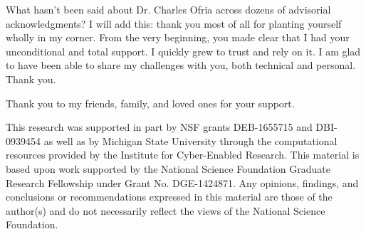 What hasn't been said about Dr. Charles Ofria across dozens of advisorial acknowledgments?
I will add this: thank you most of all for planting yourself wholly in my corner.
From the very beginning, you made clear that I had your unconditional and total support.
I quickly grew to trust and rely on it.
I am glad to have been able to share my challenges with you, both technical and personal.
Thank you.

Thank you to my friends, family, and loved ones for your support.

This research was supported in part by NSF grants DEB-1655715 and DBI-0939454 as well as by Michigan State University through the computational resources provided by the Institute for Cyber-Enabled Research.
This material is based upon work supported by the National Science Foundation Graduate Research Fellowship under Grant No. DGE-1424871.
Any opinions, findings, and conclusions or recommendations expressed in this material are those of the author(s) and do not necessarily reflect the views of the National Science Foundation.

